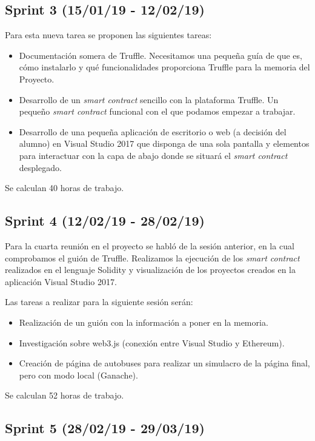 \subsection{Sprint 3 (15/01/19 - 12/02/19)}

Para esta nueva tarea se proponen las siguientes tareas:

\begin{itemize}
	\item Documentación somera de Truffle. Necesitamos una pequeña guía de que es, cómo instalarlo y qué funcionalidades proporciona Truffle para la memoria del Proyecto.
	\item Desarrollo de un \textit{smart contract} sencillo con la plataforma Truffle. Un pequeño \textit{smart contract} funcional con el que podamos empezar a trabajar.
	\item Desarrollo de una pequeña aplicación de escritorio o web (a decisión del alumno) en Visual Studio 2017 que disponga de una sola pantalla y elementos para interactuar con la capa de abajo donde se situará el \textit{smart contract} desplegado.
\end{itemize}

Se calculan 40 horas de trabajo.

\subsection{Sprint 4 (12/02/19 - 28/02/19)}

Para la cuarta reunión en el proyecto se habló de la sesión anterior, en la cual comprobamos el guión de Truffle. Realizamos la ejecución de los \textit{smart contract} realizados en el lenguaje Solidity y visualización de los proyectos creados en la aplicación Visual Studio 2017.

Las tareas a realizar para la siguiente sesión serán: 

\begin{itemize}
	\item Realización de un guión con la información a poner en la memoria.
	\item Investigación sobre web3.js (conexión entre Visual Studio y Ethereum).
	\item Creación de página de autobuses para realizar un simulacro de la página final, pero con modo local (Ganache).
\end{itemize}

Se calculan 52 horas de trabajo.

\subsection{Sprint 5 (28/02/19 - 29/03/19)}

